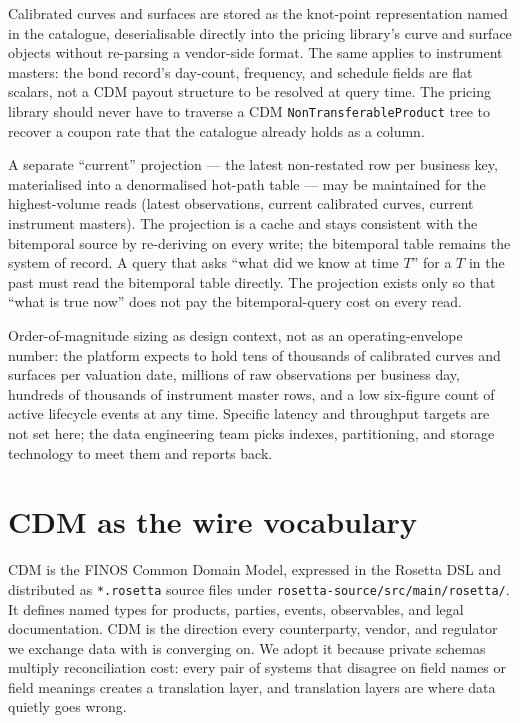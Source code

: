 \documentclass[11pt,a4paper]{article}
\begin{document}
Calibrated curves and surfaces are stored as the knot-point representation named in the catalogue, deserialisable directly into the pricing library's curve and surface objects without re-parsing a vendor-side format. The same applies to instrument masters: the bond record's day-count, frequency, and schedule fields are flat scalars, not a CDM payout structure to be resolved at query time. The pricing library should never have to traverse a CDM \texttt{NonTransferableProduct} tree to recover a coupon rate that the catalogue already holds as a column.

A separate ``current'' projection --- the latest non-restated row per business key, materialised into a denormalised hot-path table --- may be maintained for the highest-volume reads (latest observations, current calibrated curves, current instrument masters). The projection is a cache and stays consistent with the bitemporal source by re-deriving on every write; the bitemporal table remains the system of record. A query that asks ``what did we know at time $T$'' for a $T$ in the past must read the bitemporal table directly. The projection exists only so that ``what is true now'' does not pay the bitemporal-query cost on every read.

Order-of-magnitude sizing as design context, not as an operating-envelope number: the platform expects to hold tens of thousands of calibrated curves and surfaces per valuation date, millions of raw observations per business day, hundreds of thousands of instrument master rows, and a low six-figure count of active lifecycle events at any time. Specific latency and throughput targets are not set here; the data engineering team picks indexes, partitioning, and storage technology to meet them and reports back.

\section{CDM as the wire vocabulary}\label{sec:cdm}

CDM is the FINOS Common Domain Model, expressed in the Rosetta DSL and distributed as \texttt{*.rosetta} source files under \texttt{rosetta-source/src/main/rosetta/}. It defines named types for products, parties, events, observables, and legal documentation. CDM is the direction every counterparty, vendor, and regulator we exchange data with is converging on. We adopt it because private schemas multiply reconciliation cost: every pair of systems that disagree on field names or field meanings creates a translation layer, and translation layers are where data quietly goes wrong.
\end{document}
